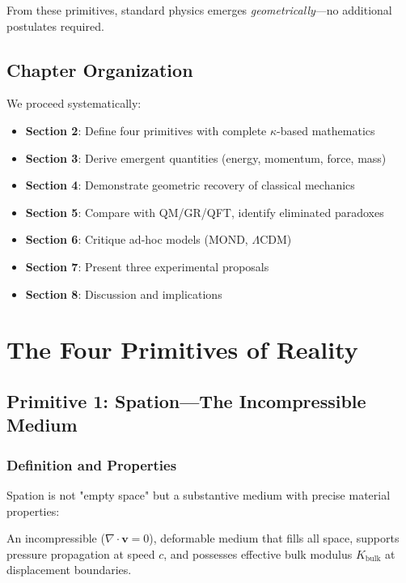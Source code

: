 From these primitives, standard physics emerges \emph{geometrically}—no additional postulates required.

\subsection{Chapter Organization}

We proceed systematically:

\begin{itemize}
\item \textbf{Section 2}: Define four primitives with complete $\kappa$-based mathematics
\item \textbf{Section 3}: Derive emergent quantities (energy, momentum, force, mass)
\item \textbf{Section 4}: Demonstrate geometric recovery of classical mechanics
\item \textbf{Section 5}: Compare with QM/GR/QFT, identify eliminated paradoxes
\item \textbf{Section 6}: Critique ad-hoc models (MOND, $\Lambda$CDM)
\item \textbf{Section 7}: Present three experimental proposals
\item \textbf{Section 8}: Discussion and implications
\end{itemize}

\section{The Four Primitives of Reality}

\subsection{Primitive 1: Spation—The Incompressible Medium}

\subsubsection{Definition and Properties}

Spation is not "empty space" but a substantive medium with precise material properties:

\begin{definition}[Spation]
An incompressible ($\nabla \cdot \mathbf{v} = 0$), deformable medium that fills all space, supports pressure propagation at speed $c$, and possesses effective bulk modulus $K_{\text{bulk}}$ at displacement boundaries.
\end{definition}

